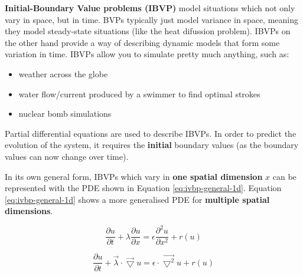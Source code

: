 \documentclass{article}
\begin{document}
\textbf{Initial-Boundary Value problems (IBVP)} model situations which not only vary in space, but in time. BVPs typically just model variance in space, meaning they model steady-state situations (like the heat difussion problem). IBVPs on the other hand provide a way of describing dynamic models that form some variation in time. IBVPs allow you to simulate pretty much anything, such as:
\begin{itemize}
	\item weather across the globe
	\item water flow/current produced by a swimmer to find optimal strokes
	\item nuclear bomb simulations
\end{itemize}

Partial differential equations are used to describe IBVPs. In order to predict the evolution of the system, it requires the \textbf{initial} boundary values (as the boundary values can now change over time).

In its own general form, IBVPs which vary in \textbf{one spatial dimension} $x$ can be represented with the PDE shown in Equation \ref{eq:ivbp-general-1d}. Equation \ref{eq:ivbp-general-1d} shows a more generalised PDE for \textbf{multiple spatial dimensions}.

\begin{equation}
	\frac{\partial u}{\partial t} + \lambda\frac{\partial u}{\partial x} = \epsilon \frac{\partial^2 u}{\partial x^2} + r(u)
	\label{eq:ivbp-general-1d}
\end{equation}

\begin{equation}
	\frac{\partial u}{\partial t} + \vec{\lambda} \cdot \vec{\bigtriangledown}u = \epsilon \cdot \vec{\bigtriangledown^2}u + r(u)
	\label{eq:ivbp-general-multid}
\end{equation}
\end{document}

